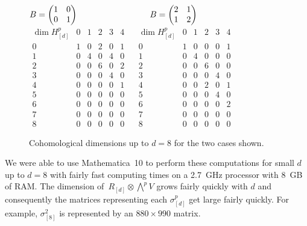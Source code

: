 \documentclass[10pt,a4paper]{amsart}
\numberwithin{equation}{section}
\begin{document}
\begin{figure}[t]\centering
$B=\begin{pmatrix}1 & 0 \\ 0 & 1\end{pmatrix}\hspace{30mm} B=\begin{pmatrix}2 & 1 \\ 1 & 2\end{pmatrix}$\vspace{1mm}\\
$\begin{array}{c|ccccc}
\dim H_{[d]}^p & 0 & 1 & 2 & 3 & 4 \\ \hline
0 & 1 & 0 & 2 & 0 & 1 \\
1 & 0 & 4 & 0 & 4 & 0 \\
2 & 0 & 0 & 6 & 0 & 2 \\
3 & 0 & 0 & 0 & 4 & 0 \\
4 & 0 & 0 & 0 & 0 & 1 \\
5 & 0 & 0 & 0 & 0 & 0 \\
6 & 0 & 0 & 0 & 0 & 0 \\
7 & 0 & 0 & 0 & 0 & 0 \\
8 & 0 & 0 & 0 & 0 & 0
\end{array}\ \ \ \
\begin{array}{c|ccccc}
\dim H_{[d]}^p & 0 & 1 & 2 & 3 & 4 \\ \hline
0 & 1 & 0 & 0 & 0 & 1 \\
1 & 0 & 4 & 0 & 0 & 0 \\
2 & 0 & 0 & 6 & 0 & 0 \\
3 & 0 & 0 & 0 & 4 & 0 \\
4 & 0 & 0 & 2 & 0 & 1 \\
5 & 0 & 0 & 0 & 4 & 0 \\
6 & 0 & 0 & 0 & 0 & 2 \\
7 & 0 & 0 & 0 & 0 & 0 \\
8 & 0 & 0 & 0 & 0 & 0
\end{array}$
\caption{\label{table1_results}Cohomological dimensions up to $d=8$ for the two cases shown.}
\end{figure}

We were able to use Mathematica~10 to perform these computations for small $d$ up to $d=8$ with fairly fast computing times on a 2.7~GHz processor with 8~GB of RAM. The dimension of~$R_{[d]}\otimes \bigwedge^p V$ grows fairly quickly with $d$ and consequently the matrices representing each $\sigma^p_{[d]}$ get large fairly quickly. For example, $\sigma^2_{[8]}$ is represented by an $880\times 990$ matrix.
\end{document}
